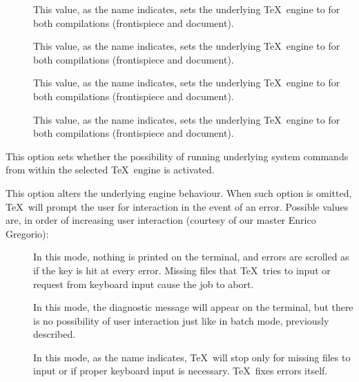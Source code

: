 \begin{description}
\begin{description}
\begin{description}
\item[] This value, as the name indicates, sets the underlying \TeX\ engine to  for both compilations (frontispiece and document).

\item[] This value, as the name indicates, sets the underlying \TeX\ engine to  for both compilations (frontispiece and document).

\item[] This value, as the name indicates, sets the underlying \TeX\ engine to  for both compilations (frontispiece and document).

\item[] This value, as the name indicates, sets the underlying \TeX\ engine to  for both compilations (frontispiece and document).
\end{description}

\item[\rpsbox{shell}] This option sets whether the possibility of running underlying system commands from within the selected \TeX\ engine is activated.

\item[\abox{interaction}] This option alters the underlying engine behaviour. When such option is omitted, \TeX\ will prompt the user for interaction in the event of an error. Possible values are, in order of increasing user interaction (courtesy of our master Enrico Gregorio):

\begin{description}
\item[] In this mode, nothing is printed on the terminal, and errors are scrolled as if the  key is hit at every error. Missing files that \TeX\ tries to input or request from keyboard input cause the job to abort.

\item[] In this mode, the diagnostic message will appear on the terminal, but there is no possibility of user interaction just like in batch mode, previously described.

\item[] In this mode, as the name indicates, \TeX\ will stop only for missing files to input or if proper keyboard input is necessary. \TeX\ fixes errors itself.


\end{description}
\end{description}
\end{description}
